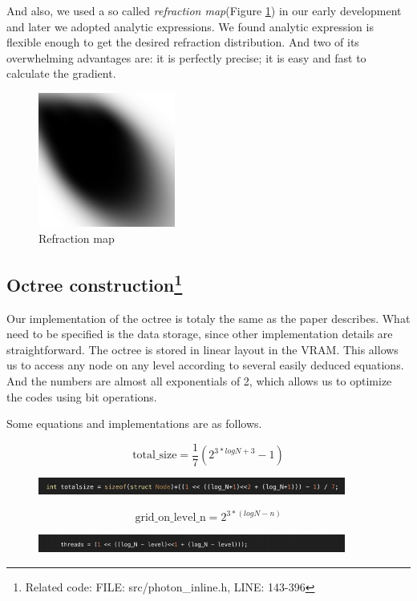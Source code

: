 \documentclass[a4paper]{article}
\begin{document}
\begin{CJK*}{UTF8}{gkai}
And also, we used a so called \textit{refraction map}(Figure \ref{fig:reframap}) in our early development and later we adopted analytic expressions. We found analytic expression is flexible enough to get the desired refraction distribution. And two of its overwhelming advantages are: it is perfectly precise; it is easy and fast to calculate the gradient.

\begin{figure}[H]
\centering
\includegraphics[width=0.4\textwidth]{reframap.png}
\caption{\label{fig:reframap}Refraction map}
\end{figure}


\subsection[Octree construction]{Octree construction\footnote{Related code: FILE: src/photon\_inline.h, LINE: 143-396}}
Our implementation of the octree is totaly the same as the paper describes. What need to be specified is the data storage, since other implementation details are straightforward. The octree is stored in linear layout in the VRAM. This allows us to access any node on any level according to several easily deduced equations. And the numbers are almost all exponentials of 2, which allows us to optimize the codes using bit operations.

Some equations and implementations are as follows.

$$\mbox{total\_size} = \frac{1}{7} {(2^{3*logN+3}-1)}$$
\begin{figure}[H]
\centering
\includegraphics[width=0.9\textwidth]{eq1.png}
\end{figure}

$$\mbox{grid\_on\_level\_n} = 2^{3*(logN-n)}$$
\begin{figure}[H]
\centering
\includegraphics[width=0.9\textwidth]{eq2.png}
\end{figure}


\end{CJK*}
\end{document}
